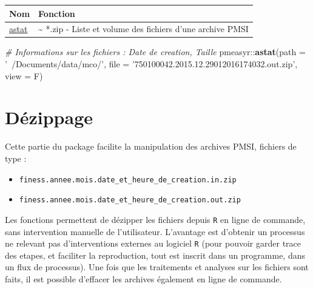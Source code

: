 \documentclass[]{book}
\newenvironment{Shaded}{\begin{snugshade}}{\end{snugshade}}
\newcommand{\KeywordTok}[1]{\textcolor[rgb]{0.13,0.29,0.53}{\textbf{{#1}}}}
\newcommand{\DataTypeTok}[1]{\textcolor[rgb]{0.13,0.29,0.53}{{#1}}}
\newcommand{\StringTok}[1]{\textcolor[rgb]{0.31,0.60,0.02}{{#1}}}
\newcommand{\CommentTok}[1]{\textcolor[rgb]{0.56,0.35,0.01}{\textit{{#1}}}}
\newcommand{\NormalTok}[1]{{#1}}
\providecommand{\tightlist}{%
  \setlength{\itemsep}{0pt}\setlength{\parskip}{0pt}}
\begin{document}
\begin{longtable}[]{@{}ll@{}}
\toprule
Nom & Fonction\tabularnewline
\midrule
\endhead
\href{https://github.com/IM-APHP/pmeasyr/tree/master/Rd_md/astat.Rmd}{astat}
& \textasciitilde{} *.zip - Liste et volume des fichiers d'une archive
PMSI\tabularnewline
\bottomrule
\end{longtable}

\begin{Shaded}
\begin{Highlighting}[]
\CommentTok{# Informations sur les fichiers : Date de creation, Taille}
\NormalTok{pmeasyr::}\KeywordTok{astat}\NormalTok{(}\DataTypeTok{path =} \StringTok{'~/Documents/data/mco/'}\NormalTok{, }
               \DataTypeTok{file =} \StringTok{'750100042.2015.12.29012016174032.out.zip'}\NormalTok{, }
               \DataTypeTok{view =} \NormalTok{F)}
\end{Highlighting}
\end{Shaded}

\section{Dézippage}\label{dezippage}

Cette partie du package facilite la manipulation des archives PMSI,
fichiers de type :

\begin{itemize}
\tightlist
\item
  \texttt{finess.annee.mois.date\_et\_heure\_de\_creation.in.zip}
\item
  \texttt{finess.annee.mois.date\_et\_heure\_de\_creation.out.zip}
\end{itemize}

Les fonctions permettent de dézipper les fichiers depuis \texttt{R} en
ligne de commande, sans intervention manuelle de l'utilisateur.
L'avantage est d'obtenir un processus ne relevant pas d'interventions
externes au logiciel \texttt{R} (pour pouvoir garder trace des etapes,
et faciliter la reproduction, tout est inscrit dans un programme, dans
un flux de processus). Une fois que les traitements et analyses sur les
fichiers sont faits, il est possible d'effacer les archives également en
ligne de commande.
\end{document}
